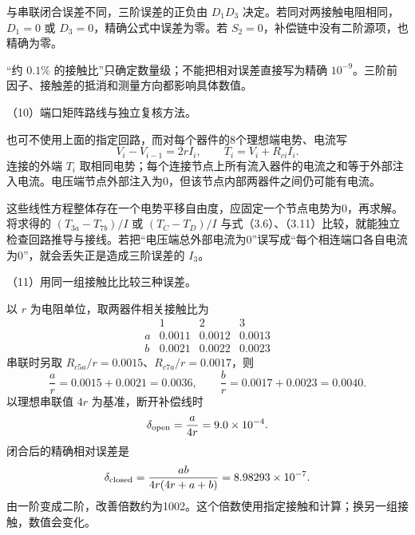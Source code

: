 \documentclass[12pt,a4paper,fontset=fandol]{ctexart}
\begin{document}
\begin{center}
\begin{minipage}{\linewidth}
\centering\begingroup
{}
\ifdim\wd\diagrambox>.88\linewidth
\sbox{\diagrambox}{\resizebox{.88\linewidth}{!}{\usebox{\diagrambox}}}
\fi
\ifdim\ht\diagrambox>.40\textheight
\resizebox{!}{.40\textheight}{\usebox{\diagrambox}}
\else\usebox{\diagrambox}\fi
\par{}
\endgroup\end{minipage}
\end{center}

与串联闭合误差不同，三阶误差的正负由 \(D_1D_3\)
决定。若同对两接触电阻相同，\(D_1=0\) 或
\(D_3=0\)，精确公式中误差为零。若
\(S_2=0\)，补偿链中没有二阶源项，也精确为零。

``约 \(0.1\%\) 的接触比''只确定数量级；不能把相对误差直接写为精确
\(10^{-9}\)。三阶前因子、接触差的抵消和测量方向都影响具体数值。

（10）端口矩阵路线与独立复核方法。

也可不使用上面的指定回路，而对每个器件的8个理想端电势、电流写 \[
V_i-V_{i-1}=2rI_i,\qquad T_i=V_i+R_{ci}I_i.
\] 连接的外端 \(T_i\)
取相同电势；每个连接节点上所有流入器件的电流之和等于外部注入电流。电压端节点外部注入为0，但该节点内部两器件之间仍可能有电流。

这些线性方程整体存在一个电势平移自由度，应固定一个节点电势为0，再求解。将求得的
\((T_{3a}-T_{7b})/I\) 或 \((T_C-T_D)/I\)
与式（3.6）、（3.11）比较，就能独立检查回路推导与接线。若把``电压端总外部电流为0''误写成``每个相连端口各自电流为0''，就会丢失正是造成三阶误差的
\(I_3\)。

（11）用同一组接触比比较三种误差。

以 \(r\) 为电阻单位，取两器件相关接触比为 \[
\begin{array}{c|ccc}
&1&2&3\\\hline
a&0.0011&0.0012&0.0013\\
b&0.0021&0.0022&0.0023
\end{array}
\] 串联时另取 \(R_{c5a}/r=0.0015\)、\(R_{c7a}/r=0.0017\)，则 \[
\frac ar=0.0015+0.0021=0.0036,\qquad
\frac br=0.0017+0.0023=0.0040.
\] 以理想串联值 \(4r\) 为基准，断开补偿线时 \[
\delta_{\rm open}=\frac{a}{4r}=9.0\times10^{-4}.
\] 闭合后的精确相对误差是 \[
\delta_{\rm closed}
=\frac{ab}{4r(4r+a+b)}
=8.98293\times10^{-7}.
\]
由一阶变成二阶，改善倍数约为1002。这个倍数使用指定接触和计算；换另一组接触，数值会变化。
\end{document}
